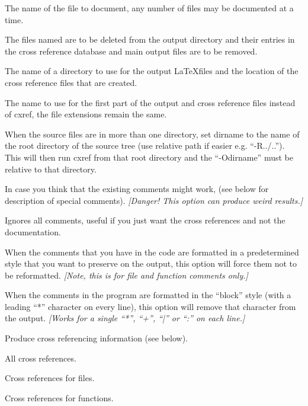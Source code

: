 \begin{list}{}{\leftmargin=1in }
\item[{\tt filename}]
The name of the file to document, any number of files may be
documented at a time.
\item[{\tt -delete}]
The files named are to be deleted from the output directory and
their entries in the cross reference database and main output
files are to be removed.
\item[{\tt -Odirname}]
The name of a directory to use for the output \LaTeX files and
the location of the cross reference files that are created.
\item[{\tt -Nbasename}]
The name to use for the first part of the output and cross
reference files instead of cxref, the file extensions remain
the same.
\item[{\tt -Rdirname}]
When the source files are in more than one directory, set
dirname to the name of the root directory of the source tree
(use relative path if easier e.g. ``-R../..'').  This will then
run cxref from that root directory and the ``-Odirname'' must be
relative to that directory.
\item[{\tt -all-comments}]
In case you think that the existing comments might work,
(see below for description of special comments).
{\it[Danger! This option can produce weird results.]}
\item[{\tt -no-comments}]
Ignores all comments, useful if you just want the cross
references and not the documentation.
\item[{\tt -verbatim-comments}]
When the comments that you have in the code are formatted
in a predetermined style that you want to preserve on the
output, this option will force them not to be reformatted.
{\it[Note, this is for file and function comments only.]}
\item[{\tt -block-comments}]
When the comments in the program are formatted in the ``block''
style (with a leading ``*'' character on every line), this option
will remove that character from the output.
{\it[Works for a single ``*'', ``+'', ``|'' or ``:'' on each line.]}
\item[{\tt -xref}]
Produce cross referencing information (see below).
\begin{list}{}{\leftmargin=1in }
\item[{\tt -all}]    All cross references.
\item[{\tt -file}]   Cross references for files.
\item[{\tt -func}]   Cross references for functions.

\end{list}
\end{list}
